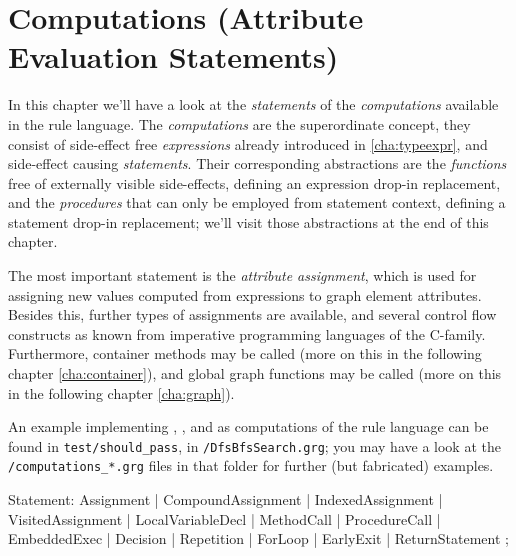 \chapter{Computations (Attribute Evaluation Statements)}
\label{cha:computations}

In this chapter we'll have a look at the \emph{statements} of the \emph{computations} available in the rule language.
The \emph{computations} are the superordinate concept, they consist of side-effect free \emph{expressions} already introduced in \ref{cha:typeexpr}, and side-effect causing \emph{statements}.
Their corresponding abstractions are the \emph{functions} free of externally visible side-effects, defining an expression drop-in replacement, and the \emph{procedures} that can only be employed from statement context, defining a statement drop-in replacement; we'll visit those abstractions at the end of this chapter.

The most important statement is the \emph{attribute assignment}, which is used for assigning new values computed from expressions to graph element attributes.
Besides this, further types of assignments are available, and several control flow constructs as known from imperative programming languages of the C-family.
Furthermore, container methods may be called (more on this in the following chapter \ref{cha:container}), 
and global graph functions may be called (more on this in the following chapter \ref{cha:graph}).

An example implementing , , and  as computations of the rule language can be found in \texttt{test/should\_pass}, in \texttt{/DfsBfsSearch.grg}; you may have a look at the \verb#/computations_*.grg# files in that folder for further (but fabricated) examples.

\begin{rail}
  Statement:
      Assignment
    | CompoundAssignment
    | IndexedAssignment
    | VisitedAssignment
    | LocalVariableDecl
    | MethodCall
    | ProcedureCall
    | EmbeddedExec
    | Decision
    | Repetition
    | ForLoop
    | EarlyExit
    | ReturnStatement
    ;
\end{rail}\label{computationstatemet}



